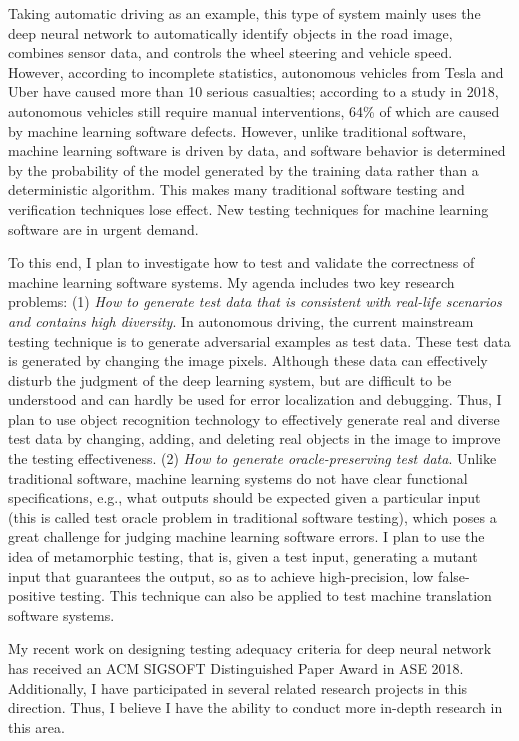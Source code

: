 \documentclass[a4paper]{article}
\begin{document}
Taking automatic driving as an example, this type of system mainly uses the deep neural network to automatically identify objects in the road image, combines sensor data, and controls the wheel steering and vehicle speed. However, according to incomplete statistics,
autonomous vehicles from Tesla and Uber have caused more than 10 serious casualties; 
according to a study in 2018, autonomous vehicles still require manual interventions, 64\% of which are caused by machine learning software defects.
However, unlike traditional software, machine learning software is driven by data, and software behavior is determined by the probability of the model generated by the training data rather than
a deterministic algorithm. This makes many traditional software testing and verification techniques lose effect. New testing techniques for machine learning software are in urgent demand.

To this end, I plan to investigate how to test and validate the correctness of machine learning software systems. 
My agenda includes two key research problems: (1) \emph{How to generate test data that is consistent with real-life scenarios and contains high diversity}.
In autonomous driving, the current mainstream testing technique is to generate adversarial examples as test data. These test data is generated by changing the image pixels. Although these data can effectively disturb the judgment of the deep learning system, but are difficult to be understood and can hardly be used for error localization and debugging. 
Thus, I plan to use object recognition technology to effectively generate real and diverse test data by changing, adding, and deleting real objects in the image to improve the testing effectiveness.
(2) \emph{How to generate oracle-preserving test data}. Unlike traditional software, machine learning systems do not have clear functional specifications, e.g., what outputs should be expected given a particular input (this is called test oracle problem in traditional software testing), which poses a great challenge for judging machine learning software errors. I plan to use the idea of metamorphic testing, that is, given a test input, generating a mutant input that guarantees the output, so as to achieve high-precision, low false-positive testing. This technique can also be applied to test machine translation software systems.

My recent work on designing testing adequacy criteria for deep neural network has received an ACM SIGSOFT Distinguished Paper Award in ASE 2018. Additionally, I have participated in several related research projects in this direction. Thus, I believe I have the ability to conduct more in-depth research in this area.
\end{document}
